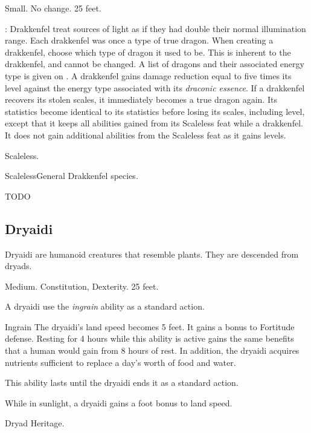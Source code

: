          Small.
         No change.
         25 feet.
        \begin{itemize}
            : Drakkenfel treat sources of light as if they had double their normal illumination range.
             Each drakkenfel was once a type of true dragon.
                When creating a drakkenfel, choose which type of dragon it used to be.
                This is inherent to the drakkenfel, and cannot be changed.
                A list of dragons and their associated energy type is given on .
             A drakkenfel gains damage reduction equal to five times its level against the energy type associated with its \textit{draconic essence}.
             If a drakkenfel recovers its stolen scales, it immediately becomes a true dragon again.
                Its statistics become identical to its statistics before losing its scales, including level, except that it keeps all abilities gained from its Scaleless feat while a drakkenfel.
                It does not gain additional abilities from the Scaleless feat as it gains levels.
        \end{itemize}
         Scaleless.

        \begin{feat}{Scaleless}{General}
            \featpre Drakkenfel species.

            TODO
            
        \end{feat}

    \subsection{Dryaidi}

        Dryaidi are humanoid creatures that resemble plants. They are descended from dryads.

         Medium.
          Constitution,  Dexterity.
         25 feet.
        \begin{itemize}
             A dryaidi use the \textit{ingrain} ability as a standard action.
                \begin{freeability}{Ingrain}
                    The dryaidi's land speed becomes 5 feet.
                    It gains a  bonus to Fortitude defense.
                    Resting for 4 hours while this ability is active gains the same benefits that a human would gain from 8 hours of rest.
                    In addition, the dryaidi acquires nutrients sufficient to replace a day's worth of food and water.

                    This ability lasts until the dryaidi ends it as a standard action.
                \end{freeability}
             While in sunlight, a dryaidi gains a  foot bonus to land speed.
        \end{itemize}
         Dryad Heritage.

